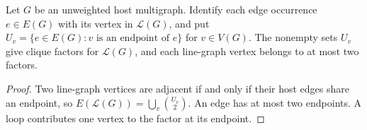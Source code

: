 \begin{lemma}\label{lem:linegraph-factors}
Let $G$ be an unweighted host multigraph. Identify each edge
occurrence $e\in E(G)$ with its vertex in $\mathcal L(G)$, and put
$U_v=\{e\in E(G):v\text{ is an endpoint of }e\}$ for $v\in V(G)$.
The nonempty sets
$U_v$ give clique factors for $\mathcal L(G)$, and each line-graph
vertex belongs to at most two factors.
\end{lemma}

\begin{proof}
Two line-graph vertices are adjacent if and only if their host edges
share an endpoint, so
$E(\mathcal L(G))=\bigcup_v\binom{U_v}{2}$.
An edge has at most two endpoints. A loop contributes one vertex
to the factor at its endpoint.
\end{proof}

